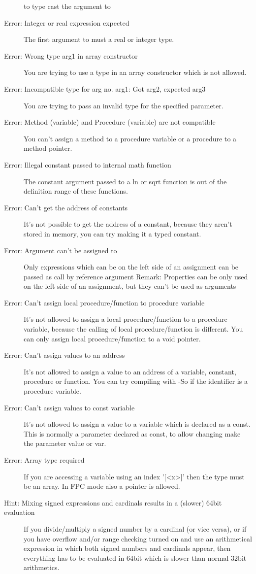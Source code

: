 \begin{description}
 to type cast the argument to 
\item [Error: Integer or real expression expected]
 The first argument to  must a real or integer type.
\item [Error: Wrong type arg1 in array constructor]
 You are trying to use a type in an array constructor which is not
 allowed.
\item [Error: Incompatible type for arg no. arg1: Got arg2, expected arg3]
 You are trying to pass an invalid type for the specified parameter.
\item [Error: Method (variable) and Procedure (variable) are not compatible]
 You can't assign a method to a procedure variable or a procedure to a
 method pointer.
\item [Error: Illegal constant passed to internal math function]
 The constant argument passed to a ln or sqrt function is out of
 the definition range of these functions.
\item [Error: Can't get the address of constants]
 It's not possible to get the address of a constant, because they
 aren't stored in memory, you can try making it a typed constant.
\item [Error: Argument can't be assigned to]
 Only expressions which can be on the left side of an
 assignment can be passed as call by reference argument
 Remark: Properties can be only
 used on the left side of an assignment, but they can't be used as arguments
\item [Error: Can't assign local procedure/function to procedure variable]
 It's not allowed to assign a local procedure/function to a
 procedure variable, because the calling of local procedure/function is
 different. You can only assign local procedure/function to a void pointer.
\item [Error: Can't assign values to an address]
 It's not allowed to assign a value to an address of a variable, constant,
 procedure or function. You can try compiling with -So if the identifier
 is a procedure variable.
\item [Error: Can't assign values to const variable]
 It's not allowed to assign a value to a variable which is declared
 as a const. This is normally a parameter declared as const, to allow
 changing make the parameter value or var.
\item [Error: Array type required]
 If you are accessing a variable using an index '[<x>]' then
 the type must be an array. In FPC mode also a pointer is allowed.
\item [Hint: Mixing signed expressions and cardinals results in a (slower) 64bit evaluation]
 If you divide/multiply a signed number by a cardinal (or vice versa),
 or if you have overflow and/or range checking turned on and use an arithmetical
 expression in which both signed numbers and cardinals appear, then everything has
 to be evaluated in 64bit which is slower than normal 32bit arithmetics.
 \end{description}

